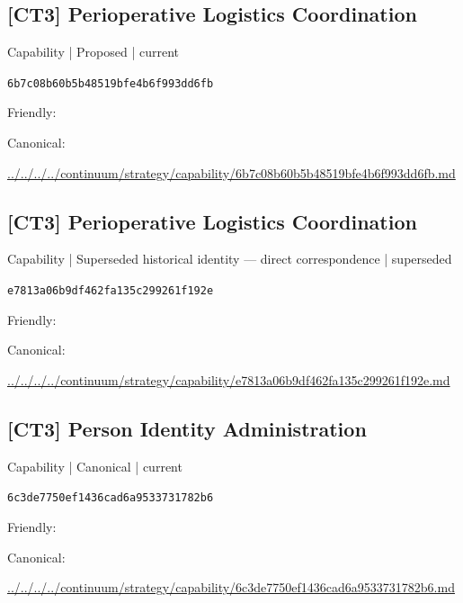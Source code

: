 \documentclass[10pt,a4paper]{article}
\begin{document}
\subsection*{[CT3] Perioperative Logistics Coordination}
{\small Capability | Proposed | current}\par
\texttt{6b7c08b60b5b48519bfe4b6f993dd6fb}\par
Friendly: \par
Canonical: \par
{\footnotesize\url{../../../../continuum/strategy/capability/6b7c08b60b5b48519bfe4b6f993dd6fb.md}}\par
\subsection*{[CT3] Perioperative Logistics Coordination}
{\small Capability | Superseded historical identity — direct correspondence | superseded}\par
\texttt{e7813a06b9df462fa135c299261f192e}\par
Friendly: \par
Canonical: \par
{\footnotesize\url{../../../../continuum/strategy/capability/e7813a06b9df462fa135c299261f192e.md}}\par
\subsection*{[CT3] Person Identity Administration}
{\small Capability | Canonical | current}\par
\texttt{6c3de7750ef1436cad6a9533731782b6}\par
Friendly: \par
Canonical: \par
{\footnotesize\url{../../../../continuum/strategy/capability/6c3de7750ef1436cad6a9533731782b6.md}}\par
\end{document}
